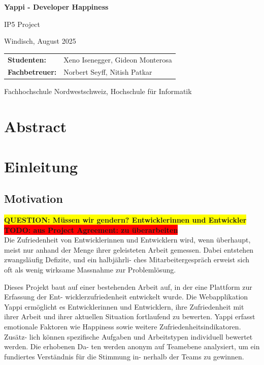 \documentclass[12pt,a4paper]{report}
\newcommand{\todo}[1]{\colorbox{red}{\textbf{TODO: #1}}\\}
\newcommand{\question}[1]{\colorbox{yellow}{\textbf{QUESTION: #1}}\\}
\begin{document}
\begin{titlepage}
  \centering
  {\huge \textbf{Yappi - Developer Happiness} \par}
  {\large IP5 Project \par}
  \vspace{0.5cm}
  {Windisch, August 2025 \par}
  \vspace{0.5cm}

  \begin{tabular}{@{}ll@{}}
    \textbf{Studenten:}    & Xeno Isenegger, Gideon Monterosa \\
    \textbf{Fachbetreuer:} & Norbert Seyff, Nitish Patkar
  \end{tabular}

  \vfill
  {Fachhochschule Nordwestschweiz, Hochschule für Informatik \par}
\end{titlepage}

\chapter*{Abstract}
\newpage

\tableofcontents
\newpage

\listoffigures
\newpage

\listoftables
\newpage

\chapter{Einleitung}

\section{Motivation}
\question{Müssen wir gendern? Entwicklerinnen und Entwickler}
\todo{aus Project Agreement: zu überarbeiten}

Die Zufriedenheit von Entwicklerinnen und Entwicklern wird, wenn überhaupt, meist nur anhand der
Menge ihrer geleisteten Arbeit gemessen. Dabei entstehen zwangsläufig Defizite, und ein halbjährli-
ches Mitarbeitergespräch erweist sich oft als wenig wirksame Massnahme zur Problemlösung.

Dieses Projekt baut auf einer bestehenden Arbeit auf, in der eine Plattform zur Erfassung der Ent-
wicklerzufriedenheit entwickelt wurde. Die Webapplikation Yappi ermöglicht es Entwicklerinnen und
Entwicklern, ihre Zufriedenheit mit ihrer Arbeit und ihrer aktuellen Situation fortlaufend zu bewerten.
Yappi erfasst emotionale Faktoren wie Happiness sowie weitere Zufriedenheitsindikatoren. Zusätz-
lich können spezifische Aufgaben und Arbeitstypen individuell bewertet werden. Die erhobenen Da-
ten werden anonym auf Teamebene analysiert, um ein fundiertes Verständnis für die Stimmung in-
nerhalb der Teams zu gewinnen.
\end{document}
